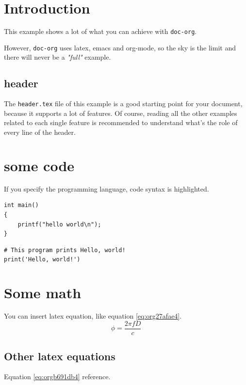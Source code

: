 


\maketitle
\thispagestyle{empty}
\newpage

\tableofcontents
\newpage

\pagestyle{plain}

\section{Introduction}
\label{sec:org91ac75a}
This example shows a lot of what you can achieve with \texttt{doc-org}.

However, \texttt{doc-org} uses latex, emacs and org-mode, so the sky is the limit and
there will never be a \emph{"full"} example.

\subsection{header}
\label{sec:orgc1e64d0}
The \texttt{header.tex} file of this example is a good starting point for your
document, because it supports a lot of features.
Of course, reading all the other examples related to each single feature is
recommended to understand what's the role of every line of the header.
\section{some code}
\label{sec:orgab93ad3}
If you specify the programming language, code syntax is highlighted.
\begin{verbatim}
int main()
{
    printf("hello world\n");
}
\end{verbatim}

\begin{verbatim}
# This program prints Hello, world!
print('Hello, world!')
\end{verbatim}

\section{Some math}
\label{sec:orgcb7e29e}
You can insert latex equation, like equation \ref{eq:org27afae4}.
\begin{equation}
\label{eq:org27afae4}
\phi = \frac{2\pi fD}{c}
\end{equation}
\subsection{Other latex equations}
\label{sec:org4039004}
Equation \ref{eq:orgb691db4} reference.

